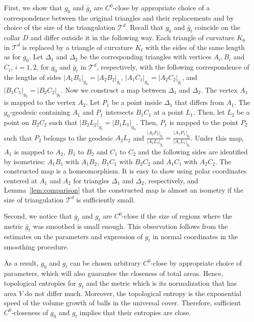 \documentclass[12pt]{article}
\numberwithin{equation}{section}
\theoremstyle{definition}
\begin{document}
First, we show that $g_0$ and $\bar g_t$ are $C^0$-close by appropriate choice of a correspondence between the original triangles and their replacements and by choice of the size of the triangulation $\mathcal T^d$. Recall that $g_0$ and $\bar g_t$ coincide on the collar $D$ and differ outside it in the following way. Each triangle of curvature $K_0$ in $\mathcal T^d$ is replaced by a triangle of curvature $K_t$ with the sides of the same length as for $g_0$. Let $\Delta_1$ and $\Delta_2$ be the corresponding triangles with vertices $A_i, B_i$ and $C_i$, $i=1,2$, for $g_0$ and $\bar g_t$ in $\mathcal T^d$, respectively, with the following correspondence of the lengths of sides $|A_1B_1|_{g_0}=|A_2B_2|_{\bar g_t}$, $|A_1C_1|_{g_0}=|A_2C_2|_{\bar g_t}$, and $|B_1C_1|_{g_0}=|B_2C_2|_{g_t}$.  Now we construct a map between $\Delta_1$ and $\Delta_2$. The vertex $A_1$ is mapped to the vertex $A_2$. Let $P_1$ be a point inside $\Delta_1$ that differs from $A_1$. The $g_0$-geodesic containing $A_1$ and $P_1$ intersects $B_1C_1$ at a point $L_1$. Then, let $L_2$ be a point on $B_2C_2$ such that $|B_2L_2|_{\bar g_t}=|B_1L_1|_{g_0}$. Then, $P_1$ is mapped to the point $P_2$ such that $P_2$ belongs to the geodesic $A_2L_2$ and $\frac{|A_2P_2|_{\bar g_t}}{|A_2L_2|_{\bar g_t}}= \frac{|A_1P_1|_{g_0}}{|A_1L_1|_{g_0}}$. Under this map, $A_1$ is mapped to $A_2$, $B_1$ to $B_2$ and $C_1$ to $C_2$ and the following sides are identified by isometries: $A_1B_1$ with $A_1B_2$, $B_1C_1$ with $B_2C_2$ and $A_1C_1$ with $A_2C_2$. The constructed map is a homeomorphism. It is easy to show using polar coordinates centered at $A_1$ and $A_2$ for triangles $\Delta_1$ and $\Delta_2$, respectively, and Lemma~\ref{lem:comparison} that the constructed map is almost an isometry if the size of triangulation $\mathcal T^d$ is sufficiently small.

Second, we notice that $\bar g_t$ and $g_t$ are $C^0$-close if the size of regions where the metric $\bar g_t$ was smoothed is small enough. This observation follows from the estimates on the parameters and expression of $g_t$ in normal coordinates in the smoothing procedure.

As a result, $g_0$ and $g_t$ can be chosen arbitrary $C^0$-close by appropriate choice of parameters, which will also guarantee the closeness of total areas. Hence, topological entropies for $g_t$ and the metric which is its normalization that has area $V$ do not differ much. Moreover, the topological entropy is the exponential speed of the volume growth of balls in the universal cover. Therefore, sufficient $C^0$-closeness of $g_0$ and $g_t$ implies that their entropies are close.
\end{document}
